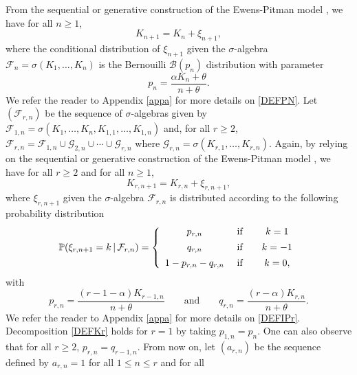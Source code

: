 \documentclass[twoside,12pt]{article}
\newcommand{\dP}{\mathbb{P}}
\newcommand{\cB}{\mathcal{B}}
\newcommand{\cF}{\mathcal{F}}
\begin{document}
From the sequential or generative construction of the Ewens-Pitman model \citep[Proposition 9]{Pit(95)}, we have for all $n \geq 1$,
\begin{equation}\label{DEFK}
K_{n+1} = K_n + \xi_{n+1},
\end{equation}
where the conditional distribution of $\xi_{n+1}$ given the $\sigma$-algebra $\cF_n=\sigma(K_1, \ldots,K_n)$ is the Bernouilli $\cB(p_n)$ distribution with parameter
\begin{equation}
\label{DEFPN}
p_n=\frac{\alpha K_n+ \theta}{n+\theta}.
\end{equation} 
We refer the reader to Appendix \ref{appa} for more details on \eqref{DEFPN}. Let $(\mathcal{F}_{r,n})$ be the sequence of $\sigma$-algebras given by $\mathcal{F}_{1,n}=\sigma(K_1, \ldots,K_n,K_{1,1},\ldots,K_{1,n})$ and, for all $r\geq2$, $\mathcal{F}_{r,n}=\mathcal{F}_{1,n}\cup\mathcal{G}_{2,n}\cup\cdots\cup\mathcal{G}_{r,n}$ where $\mathcal{G}_{r,n}=\sigma(K_{r,1},\ldots,K_{r,n})$. Again, by relying on the sequential or generative construction of the  Ewens-Pitman model \citep{Ber(24)}, we have for all $r \geq 2$ and for all $n \geq 1$,
\begin{equation}\label{DEFKr}
K_{r,n+1}=K_{r,n}+\xi_{r,n+1},
\end{equation}
where $\xi_{r,n+1}$ given the $\sigma$-algebra $\mathcal{F}_{r,n}$ is distributed according to the following probability distribution
\begin{equation}
\label{DEFXIKr}
   \dP(\xi_{r,n+1}=k\,|\,\mathcal{F}_{r,n})=\left \{ \begin{array}{ccc}
    {p_{r,n}}  & \text{ if } & \ \ k=1 \vspace{1ex}\\
    {q_{r,n}}  & \text{ if } & \ \ k=-1 \vspace{1ex}\\
     {1-p_{r,n}-q_{r,n}} & \text{ if }  & \ \ k=0,
   \end{array}  \right.
\end{equation}
with
\begin{equation}
\label{DEFIPr}
p_{r,n}=\frac{(r-1-\alpha)K_{r-1,n}}{n+\theta}\qquad \text{and}\qquad q_{r,n}=\frac{(r-\alpha)K_{r,n}}{n+\theta}.
\end{equation}
We refer the reader to Appendix \ref{appa} for more details on \eqref{DEFIPr}. Decomposition \eqref{DEFKr} holds for $r=1$ by taking $p_{1,n}=p_n$. One can also observe that for all $r \geq 2$, $p_{r,n}=q_{r-1,n}$. 
From now on, let $(a_{r,n})$ be the sequence defined by $a_{r,n}=1$ for all $1 \leq n \leq r$ and for all 
\end{document}
